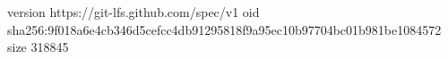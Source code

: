 version https://git-lfs.github.com/spec/v1
oid sha256:9f018a6e4cb346d5cefcc4db91295818f9a95ec10b97704bc01b981be1084572
size 318845
